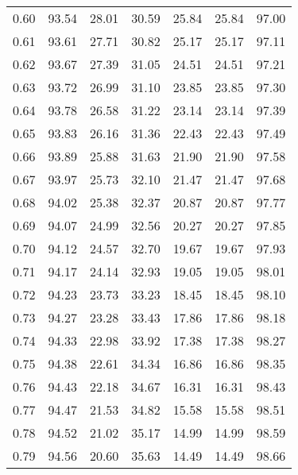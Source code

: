 \begin{tabular}{|c|c|c|c|c|c|c|}
      0.60 &     93.54 &     28.01 &      30.59 &   25.84 &      25.84 &         97.00 \\
      0.61 &     93.61 &     27.71 &      30.82 &   25.17 &      25.17 &         97.11 \\
      0.62 &     93.67 &     27.39 &      31.05 &   24.51 &      24.51 &         97.21 \\
      0.63 &     93.72 &     26.99 &      31.10 &   23.85 &      23.85 &         97.30 \\
      0.64 &     93.78 &     26.58 &      31.22 &   23.14 &      23.14 &         97.39 \\
      0.65 &     93.83 &     26.16 &      31.36 &   22.43 &      22.43 &         97.49 \\
      0.66 &     93.89 &     25.88 &      31.63 &   21.90 &      21.90 &         97.58 \\
      0.67 &     93.97 &     25.73 &      32.10 &   21.47 &      21.47 &         97.68 \\
      0.68 &     94.02 &     25.38 &      32.37 &   20.87 &      20.87 &         97.77 \\
      0.69 &     94.07 &     24.99 &      32.56 &   20.27 &      20.27 &         97.85 \\
      0.70 &     94.12 &     24.57 &      32.70 &   19.67 &      19.67 &         97.93 \\
      0.71 &     94.17 &     24.14 &      32.93 &   19.05 &      19.05 &         98.01 \\
      0.72 &     94.23 &     23.73 &      33.23 &   18.45 &      18.45 &         98.10 \\
      0.73 &     94.27 &     23.28 &      33.43 &   17.86 &      17.86 &         98.18 \\
      0.74 &     94.33 &     22.98 &      33.92 &   17.38 &      17.38 &         98.27 \\
      0.75 &     94.38 &     22.61 &      34.34 &   16.86 &      16.86 &         98.35 \\
      0.76 &     94.43 &     22.18 &      34.67 &   16.31 &      16.31 &         98.43 \\
      0.77 &     94.47 &     21.53 &      34.82 &   15.58 &      15.58 &         98.51 \\
      0.78 &     94.52 &     21.02 &      35.17 &   14.99 &      14.99 &         98.59 \\
      0.79 &     94.56 &     20.60 &      35.63 &   14.49 &      14.49 &         98.66 \\

\end{tabular}
